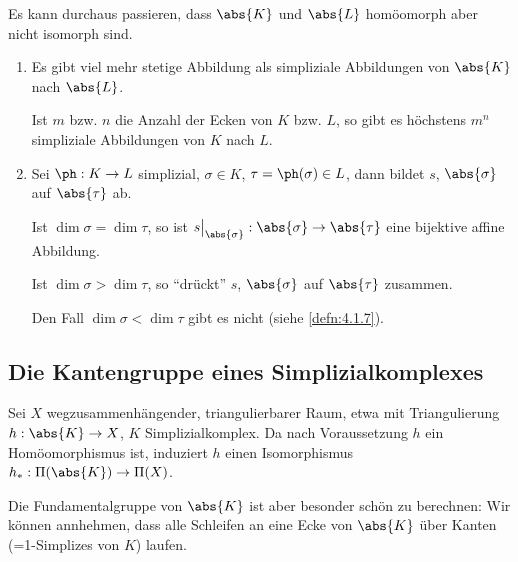 \begin{bemn}
Es kann durchaus passieren, dass $\abs{K}$ und $\abs{L}$ homöomorph aber nicht
isomorph sind.\maphere
\end{bemn}
\begin{bemn}[Bemerkungen.]
\begin{enumerate}[label=\arabic{*}.)]
  \item Es gibt viel mehr stetige Abbildung als simpliziale Abbildungen von
  $\abs{K}$ nach $\abs{L}$.

Ist $m$ bzw. $n$ die Anzahl der Ecken von $K$ bzw. $L$, so gibt es höchstens
$m^n$ simpliziale Abbildungen von $K$ nach $L$.
\item Sei $\ph: K\to L$ simplizial, $\sigma\in K$, $\tau=\ph(\sigma)\in L$,
dann bildet $s$, $\abs{\sigma}$ auf $\abs{\tau}$ ab.

Ist $\dim\sigma = \dim \tau$, so ist $s\big|_{\abs{\sigma}}:
\abs{\sigma}\to\abs{\tau}$ eine bijektive affine Abbildung.

Ist $\dim\sigma > \dim \tau$, so ``drückt'' $s$, $\abs{\sigma}$ auf
$\abs{\tau}$ zusammen.

Den Fall $\dim\sigma <\dim\tau$ gibt es nicht (siehe \ref{defn:4.1.7}).\maphere
\end{enumerate}
\end{bemn}


\subsection{Die Kantengruppe eines Simplizialkomplexes}

Sei $X$ wegzusammenhängender, triangulierbarer Raum, etwa mit Triangulierung
$h: \abs{K}\to X$, $K$ Simplizialkomplex. Da nach Voraussetzung $h$ ein Homöomorphismus
ist, induziert $h$ einen Isomorphismus $h_* : \Pi(\abs{K})\to \Pi(X)$.

Die Fundamentalgruppe von $\abs{K}$ ist aber besonder schön zu berechnen:
Wir können annhehmen, dass alle Schleifen an eine Ecke von $\abs{K}$ über
Kanten (=1-Simplizes von $K$) laufen.


